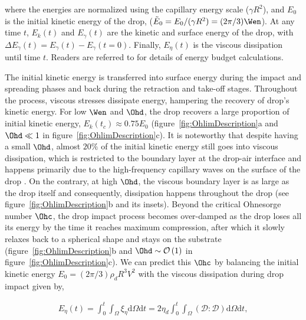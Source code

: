 \noindent where the energies are normalized using the capillary energy scale ($\gamma R^2$), and $E_0$ is the initial kinetic energy of the drop, ($\tilde{E}_0 = E_0/(\gamma R^2) = (2\pi/3)\Wen$). At any time $t$, $E_k(t)$ and $E_\gamma(t)$ are the kinetic and surface energy of the drop, with $\Delta E_\gamma(t) = E_\gamma(t) - E_\gamma(t = 0)$. Finally, $E_\eta(t)$ is the viscous dissipation until time $t$. Readers are referred to \citet{landau2013course, wildeman2016spreading, ramirez2020lifting, sanjay2022taylor} for details of energy budget calculations. 

The initial kinetic energy is transferred into surface energy during the impact and spreading phases and back during the retraction and take-off stages. Throughout the process, viscous stresses dissipate energy, hampering the recovery of drop's kinetic energy. For low $\Wen$ and $\Ohd$, the drop recovers a large proportion of initial kinetic energy, $E_k(t_c) \approx 0.75E_0$ (figure~\ref{fig:OhlimDescription}a and $\Ohd \ll 1$ in figure~\ref{fig:OhlimDescription}c). It is noteworthy that despite having a small $\Ohd$, almost $20\%$ of the initial kinetic energy still goes into viscous dissipation, which is restricted to the boundary layer at the drop-air interface and happens primarily due to the high-frequency capillary waves on the surface of the drop \cite[see the insets of figure~\ref{fig:OhlimDescription}a and][]{renardy2003pyramidal, zhang2022impact}. On the contrary, at high $\Ohd$, the viscous boundary layer is as large as the drop itself \citep{eggers2010drop} and consequently, dissipation happens throughout the drop (see figure~\ref{fig:OhlimDescription}b and its insets). Beyond the critical Ohnesorge number $\Ohc$, the drop impact process becomes over-damped as the drop loses all its energy by the time it reaches maximum compression, after which it slowly relaxes back to a spherical shape and stays on the substrate (figure~\ref{fig:OhlimDescription}b and $\Ohd \sim \mathcal{O}\left(1\right)$ in figure~\ref{fig:OhlimDescription}c). We can predict this $\Ohc$ by balancing the initial kinetic energy $E_0 = (2\pi/3)\rho_dR^3V^2$ with the viscous dissipation during drop impact given by,

\begin{align}
	E_\eta(t) = \int_{0}^{t}\int_\Omega \xi_\eta \mathrm{d}\Omega \mathrm{d}t = 2\eta_d\int_{0}^{t}\int_\Omega\left(\boldsymbol{\mathcal{D}:\mathcal{D}}\right) \mathrm{d}\Omega \mathrm{d}t,
\end{align}

